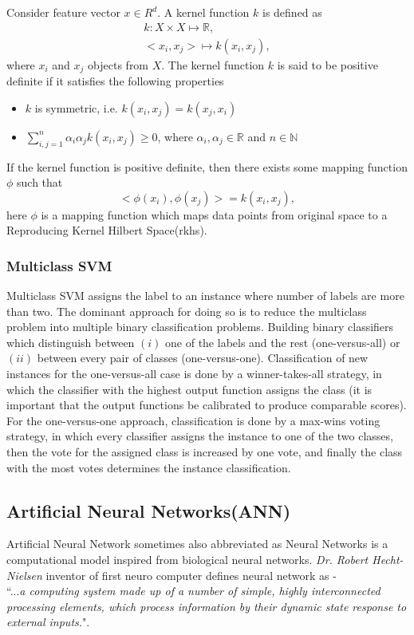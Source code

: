 Consider feature vector $x \in R^d$. A kernel function $k$ is defined as
\begin{equation}\label{eqn:kernel1}
\begin{aligned}
k:X \times X \mapsto \mathbb{R}, \\
<x_i, x_j> \mapsto k(x_i, x_j),
\end{aligned}
\end{equation}
where $x_i$ and $x_j$ objects from $X$.
The kernel function $k$ is said to be positive definite if it satisfies the following properties
\begin{itemize}
\item $k$ is symmetric, i.e. $k(x_i, x_j)=k(x_j, x_i)$
\item $ \sum \limits_{i,j =1}^{n}\alpha_i \alpha_j k(x_i, x_j)\geq 0$, where $\alpha_i, \alpha_j \in \mathbb{R}$ and $n \in \mathbb{N}$
\end{itemize}
 If the kernel function is positive definite, then there exists some mapping function $\phi$ such that
 \begin{equation}\label{eqn:kernel2}
 <\phi(x_i), \phi(x_j)> = k(x_i, x_j),
 \end{equation}
 here $\phi$ is a mapping function which maps data points from original space to a Reproducing Kernel Hilbert Space({\sc rkhs}).

\subsubsection{Multiclass SVM}
\label{subsubsection_mc_svm}
Multiclass {\sc SVM } assigns the label to an instance where number of labels are more than two. The dominant approach for doing so is to reduce the multiclass problem into multiple binary classification problems. Building binary classifiers which distinguish between $(i)$ one of the labels and the rest (one-versus-all) or $(ii)$ between every pair of classes (one-versus-one). Classification of new instances for the one-versus-all case is done by a winner-takes-all strategy, in which the classifier with the highest output function assigns the class (it is important that the output functions be calibrated to produce comparable scores). For the one-versus-one approach, classification is done by a max-wins voting strategy, in which every classifier assigns the instance to one of the two classes, then the vote for the assigned class is increased by one vote, and finally the class with the most votes determines the instance classification.

\subsection{Artificial Neural Networks(ANN)}
\label{subsec:ANN}
Artificial Neural Network sometimes also abbreviated as Neural Networks is a computational model inspired from biological neural networks. \textit{Dr. Robert Hecht-Nielsen} inventor of first neuro computer defines neural network as - \\
``...\textit{a computing system made up of a number of simple, highly interconnected processing elements, which process information by their dynamic state response to external inputs.}". 
